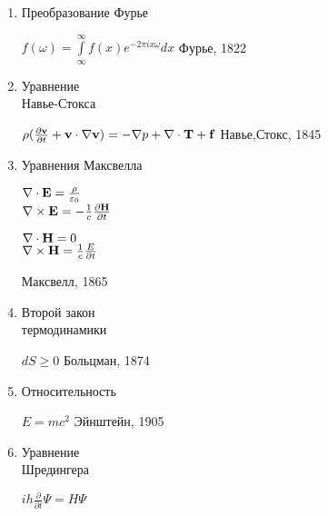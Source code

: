 \documentclass[12pt]{article}
\begin{document}
\begin{enumerate}
 \item Преобразование Фурье \hfill \begin{minipage}[t]{100mm} $f(\omega) = \int\limits_\infty ^\infty f(x)e^{-2\pi ix \omega}dx$  \hfill Фурье, 1822 \end{minipage}
 \item 
  \begin{minipage}[t]{45mm} Уравнение \\Навье-Стокса\\
  \end{minipage}
  \hfill
  \begin{minipage}[t]{100mm}$\rho(\frac{\partial {\bf v}}{\partial t}+{\bf v}\cdot\nabla{\bf v} ) = -\nabla p+\nabla\cdot{\bf T}+{\bf f}$ \hfill Навье,Стокс, 1845
  \end{minipage}
   \item Уравнения Максвелла \hfill \begin{minipage}[t]{100mm}  \begin{minipage}[t]{30mm}  $\nabla\cdot{\bf E} =   \frac{\rho}{\varepsilon_0}$ \\ $\nabla\times{\bf E} = -\frac{1}{c} \frac{\partial{\bf H}}{\partial t}$ \\ \end{minipage}
  \begin{minipage}[t]{30mm} $\nabla\cdot{\bf H} = 0$ \\$\nabla\times{\bf H} = \frac{1}{c} \frac {E}{\partial t}$ \\
   \end{minipage}  \hfill Максвелл, 1865\end{minipage}
   \item \begin{minipage}[t]{45mm} Второй закон \\термодинамики\\ \end{minipage}
  \hfill
 \begin{minipage}[t]{100mm}  $dS \ge 0$ \hfill Больцман, 1874 \end{minipage}
  \item Относительность \hfill \begin{minipage}[t]{100mm} $E = mc^2$ \hfill Эйнштейн, 1905
\end{minipage}
\item\begin{minipage}[t]{45mm} Уравнение \\Шредингера\\ \end{minipage}  \hfill \begin{minipage}[t]{100mm} $ih\frac{\partial}{\partial t}\Psi = H\Psi $

\end{minipage}
\end{enumerate}
\end{document}
